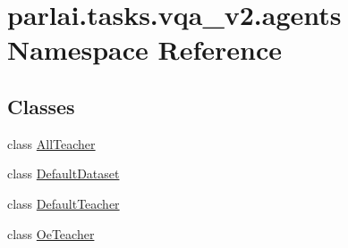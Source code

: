 \hypertarget{namespaceparlai_1_1tasks_1_1vqa__v2_1_1agents}{}\section{parlai.\+tasks.\+vqa\+\_\+v2.\+agents Namespace Reference}
\label{namespaceparlai_1_1tasks_1_1vqa__v2_1_1agents}
\subsection*{Classes}
\begin{DoxyCompactItemize}
\item 
class \hyperlink{classparlai_1_1tasks_1_1vqa__v2_1_1agents_1_1AllTeacher}{All\+Teacher}
\item 
class \hyperlink{classparlai_1_1tasks_1_1vqa__v2_1_1agents_1_1DefaultDataset}{Default\+Dataset}
\item 
class \hyperlink{classparlai_1_1tasks_1_1vqa__v2_1_1agents_1_1DefaultTeacher}{Default\+Teacher}
\item 
class \hyperlink{classparlai_1_1tasks_1_1vqa__v2_1_1agents_1_1OeTeacher}{Oe\+Teacher}
\end{DoxyCompactItemize}

